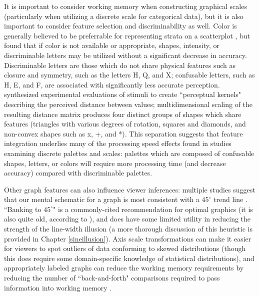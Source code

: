 \documentclass[11pt]{isuthesis}\usepackage[]{graphicx}\usepackage[]{color}
\begin{document}
It is important to consider working memory when constructing graphical scales (particularly when utilizing a discrete scale for categorical data), but it is also important to consider feature selection and discriminability as well. Color is generally believed to be preferrable for representing strata on a scatterplot \citep{cleveland:1984}, but \citet{lewandowsky1989discriminating} found that if color is not available or appropriate, shapes, intensity, or discriminable letters may be utilized without a significant decrease in accuracy. Discriminable letters are those which do not share physical features such as closure and symmetry, such as the letters H, Q, and X; confusable letters, such as H, E, and F, are associated with significantly less accurate perception. \citet{heer:2014} synthesized experimental evaluations of stimuli to create ``perceptual kernels" describing the perceived distance between values; multidimensional scaling of the resulting distance matrix produces four distinct groups of shapes which share features (triangles with various degrees of rotation, squares and diamonds, and non-convex shapes such as x, +, and *). This separation suggests that feature integration underlies many of the processing speed effects found in studies examining discrete palettes and scales: palettes which are composed of confusable shapes, letters, or colors will require more processing time (and decrease accuracy) compared with discriminable palettes.

Other graph features can also influence viewer inferences: multiple studies suggest that our mental schematic for a graph is most consistent with a $45^\circ$ trend line \citep{cleveland:88, tversky1989perceptual}. ``Banking to $45^\circ$" is a commonly-cited recommendation for optimal graphics (it is also quite old, according to \citet{wickham2013graphical}), and does have some limited utility in reducing the strength of the line-width illusion (a more thorough discussion of this heuristic is provided in Chapter \ref{sineillusion}). Axis scale transformations can make it easier for viewers to spot outliers of data conforming to skewed distributions (though this does require some domain-specific knowledge of statistical distributions), and appropriately labeled graphs can reduce the working memory requirements by reducing the number of ``back-and-forth" comparisons required to pass information into working memory \citep{shah2005cambridge}. 
\end{document}
